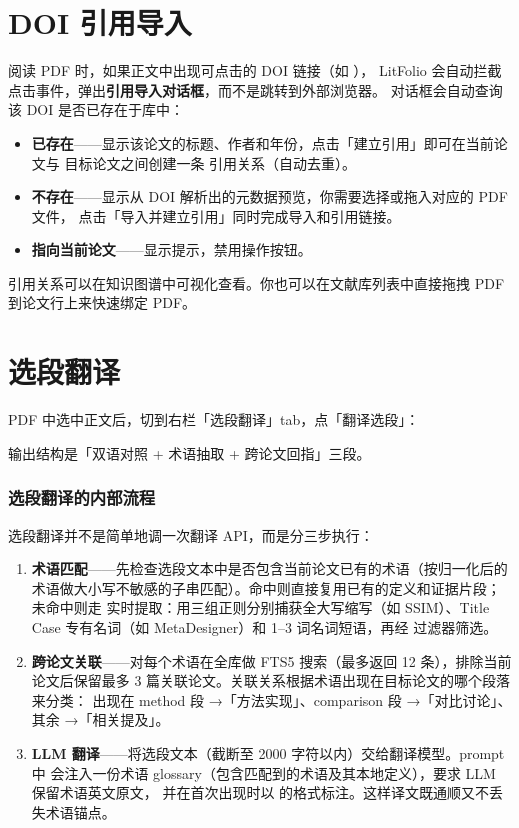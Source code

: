 \section{DOI 引用导入}

阅读 PDF 时，如果正文中出现可点击的 DOI 链接（如 ），
LitFolio 会自动拦截点击事件，弹出\textbf{引用导入对话框}，而不是跳转到外部浏览器。
对话框会自动查询该 DOI 是否已存在于库中：

\begin{itemize}
  \item \textbf{已存在}——显示该论文的标题、作者和年份，点击「建立引用」即可在当前论文与
    目标论文之间创建一条  引用关系（自动去重）。
  \item \textbf{不存在}——显示从 DOI 解析出的元数据预览，你需要选择或拖入对应的 PDF 文件，
    点击「导入并建立引用」同时完成导入和引用链接。
  \item \textbf{指向当前论文}——显示提示，禁用操作按钮。
\end{itemize}

\begin{tipbox}
引用关系可以在知识图谱中可视化查看。你也可以在文献库列表中直接拖拽 PDF 到论文行上来快速绑定 PDF。
\end{tipbox}

\section{选段翻译}

PDF 中选中正文后，切到右栏「选段翻译」tab，点「翻译选段」：


输出结构是「双语对照 + 术语抽取 + 跨论文回指」三段。

\subsubsection{选段翻译的内部流程}

选段翻译并不是简单地调一次翻译 API，而是分三步执行：

\begin{enumerate}
  \item \textbf{术语匹配}——先检查选段文本中是否包含当前论文已有的术语（按归一化后的
    术语做大小写不敏感的子串匹配）。命中则直接复用已有的定义和证据片段；未命中则走
    实时提取：用三组正则分别捕获全大写缩写（如 SSIM）、Title Case 专有名词（如
    MetaDesigner）和 1–3 词名词短语，再经  过滤器筛选。
  \item \textbf{跨论文关联}——对每个术语在全库做 FTS5 搜索（最多返回 12 条），排除当前
    论文后保留最多 3 篇关联论文。关联关系根据术语出现在目标论文的哪个段落来分类：
    出现在 method 段 →「方法实现」、comparison 段 →「对比讨论」、其余 →「相关提及」。
  \item \textbf{LLM 翻译}——将选段文本（截断至 2000 字符以内）交给翻译模型。prompt 中
    会注入一份术语 glossary（包含匹配到的术语及其本地定义），要求 LLM 保留术语英文原文，
    并在首次出现时以  的格式标注。这样译文既通顺又不丢失术语锚点。
\end{enumerate}

